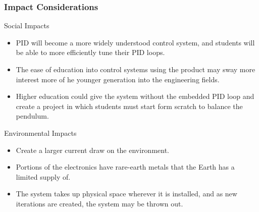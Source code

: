 \documentclass[aspectratio=169]{beamer}
\begin{document}
\begin{frame}
    \frametitle{Impact Considerations}
    
    \begin{block}{Social Impacts}
        \begin{itemize}
        \item PID will become a more widely understood control system, and students will be able to more efficiently tune their PID loops.
        \item The ease of education into control systems using the product may sway more interest more of he younger generation into the engineering fields.
        \item Higher education could give the system without the embedded PID loop and create a project in which students must start form scratch to balance the pendulum.
     
        \end{itemize}
    \end{block}
    
    \begin{block}{Environmental Impacts}
        \begin{itemize}
        \item Create a larger current draw on the environment.
        \item Portions of the electronics have rare-earth metals that the Earth has a limited supply of.
        \item The system takes up physical space wherever it is installed, and as new iterations are created, the system may be thrown out. 
        \end{itemize}
    \end{block}

    

    

\end{frame}
\end{document}
